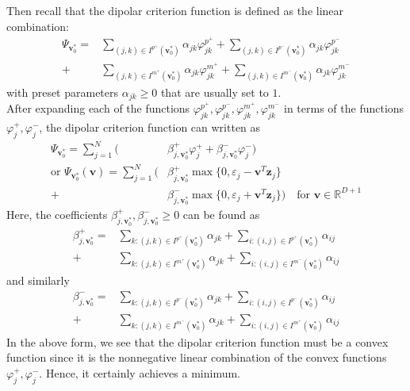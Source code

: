 \documentclass[12pt]{amsart}
\theoremstyle{definition}
\theoremstyle{plain}
\theoremstyle{remark}
\newcommand{\RR}{\mathbb{R}}
\newcommand{\eps}{\varepsilon}
\begin{document}
Then recall that the  dipolar criterion function is defined as the linear combination:
\begin{align*}
	\Psi_{\mathbf{v}_0^\ast} = &\sum_{(j, k) \in I^{p^+}(\mathbf{v}_0^\ast)} \alpha_{jk} \varphi^{p^+}_{jk} + \sum_{(j, k) \in I^{p^-}(\mathbf{v}_0^\ast)} \alpha_{jk} \varphi^{p^-}_{jk} \\ 
	+ &\sum_{(j, k) \in I^{m^+}(\mathbf{v}_0^\ast)} \alpha_{jk} \varphi^{m^+}_{jk} + \sum_{(j, k) \in I^{m^-}(\mathbf{v}_0^\ast)} \alpha_{jk} \varphi^{m^-}_{jk}
\end{align*} with preset parameters $\alpha_{jk} \geq 0$ that are usually set to $1$. \\

After expanding each of the functions $\varphi^{p^+}_{jk}, \varphi^{p^-}_{jk}, \varphi^{m^+}_{jk}, \varphi^{m^-}_{jk}$ in terms of the functions $\varphi^+_j, \varphi^-_j$, the dipolar criterion function can written as
\begin{align*}
\Psi_{\mathbf{v}_0^\ast} = \sum_{j = 1}^N \big( &\beta^+_{j, \mathbf{v}_0^\ast}\varphi^+_j + \beta^-_{j, \mathbf{v}_0^\ast}\varphi^-_j\big) \\
\text{or } \Psi_{\mathbf{v}_0^\ast}(\mathbf{v})	= \sum_{j = 1}^N \big( &\beta^+_{j, \mathbf{v}_0^\ast}\max\{0, \eps_j - \mathbf{v}^T \mathbf{z}_j\} \\
+ &\beta^-_{j, \mathbf{v}_0^\ast}\max\{0, \eps_j + \mathbf{v}^T \mathbf{z}_j\}\big) \quad \text{for }\mathbf{v} \in \RR^{D + 1}
\end{align*} Here, the coefficients $\beta^+_{j, \mathbf{v}_0^\ast}, \beta^-_{j, \mathbf{v}_0^\ast} \geq 0$ can be found as
\begin{align*}
\beta^+_{j, \mathbf{v}_0^\ast} = &\sum_{k : (j, k) \in I^{p^+}(\mathbf{v}_0^\ast)} \alpha_{jk} + \sum_{i : (i, j) \in I^{p^+}(\mathbf{v}_0^\ast)} \alpha_{ij} \\
	+ &\sum_{k : (j, k) \in I^{m^+}(\mathbf{v}_0^\ast)} \alpha_{jk} + \sum_{i : (i, j) \in I^{m^-}(\mathbf{v}_0^\ast)} \alpha_{ij}
\end{align*} and similarly
\begin{align*}
\beta^-_{j, \mathbf{v}_0^\ast} = &\sum_{k : (j, k) \in I^{p^-}(\mathbf{v}_0^\ast)} \alpha_{jk} + \sum_{i : (i, j) \in I^{p^-}(\mathbf{v}_0^\ast)} \alpha_{ij} \\
	+ &\sum_{k : (j, k) \in I^{m^-}(\mathbf{v}_0^\ast)} \alpha_{jk} + \sum_{i : (i, j) \in I^{m^+}(\mathbf{v}_0^\ast)} \alpha_{ij}
\end{align*} In the above form, we see that the dipolar criterion function must be a convex function since it is the nonnegative linear combination of the convex functions $\varphi^+_j, \varphi^-_j$. Hence, it certainly achieves a minimum. \\
\end{document}
